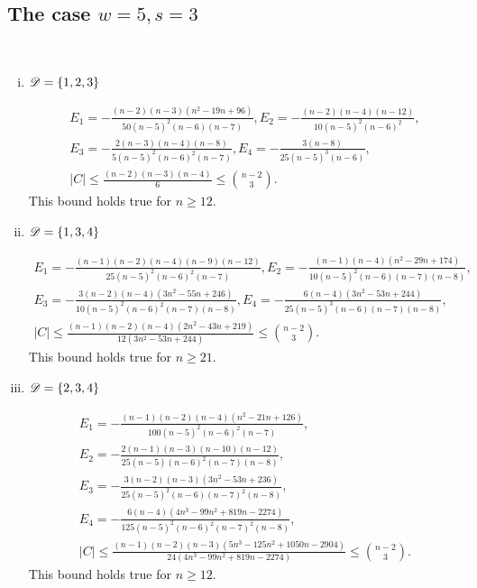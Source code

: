 \documentclass{amsart}
\begin{document}
{\begin{enumerate}[(i)]
\end{enumerate}

\subsection{The case \texorpdfstring{$w=5,s=3$}.}  \label{App:5,3}\hfill\\
\begin{enumerate}[(i)]
\item $\mathscr{D}=\{1,2,3\}$

\begin{gather*}
E_1=-\frac{(n-2)(n-3)\left(n^2-19n+96\right)}{50(n-5)^2 (n-6)(n-7)}, E_2=-\frac{(n-2)(n-4)(n-12)}{10(n-5)^2(n-6)^2},\\ E_3=-\frac{2(n-3)(n-4)(n-8)}{5(n-5)^2(n-6)^2(n-7)},
E_4=-\frac{3(n-8)}{25(n-5)^3(n-6)},\\
|C|\le \frac{(n-2)(n-3)(n-4)}{6}\le \binom{n-2}{3}.
\end{gather*}
This bound holds true for $n\ge 12.$

\item $\mathscr{D}=\{1,3,4\}$

\begin{gather*}
E_1=-\frac{(n-1)(n-2)(n-4)(n-9)(n-12)}{25(n-5)^2 (n-6)^2 (n-7)}, E_2=-\frac{(n-1)(n-4)\left(n^2-29n+174\right)}{10(n-5)^2(n-6)(n-7)(n-8)},\\ E_3=-\frac{3(n-2)(n-4)\left(3n^2-55n+246\right)}{10(n-5)^2(n-6)^2(n-7)(n-8)},
E_4=-\frac{6(n-4)\left(3n^2-53n+244\right)}{25(n-5)^3(n-6)(n-7)(n-8)},\\
|C| \leq \frac{\left(n - 1\right) \left(n - 2\right) \left(n - 4\right) \left(2 n^{2} - 43 n + 219\right)}{12 \left(3 n^{2} - 53 n + 244\right)} \le \binom{n-2}{3}.
\end{gather*}
This bound holds true for $n\ge 21.$

\item $\mathscr{D}=\{2,3,4\}$

\begin{gather*}
E_1=-\frac{(n-1)(n-2)(n-4)\left(n^2-21n+126\right)}{100(n-5)^2 (n-6)^2 (n-7)}, \\
E_2=-\frac{2(n-1)(n-3)(n-10)(n-12)}{25(n-5)(n-6)^2(n-7)(n-8)},\\ 
E_3=-\frac{3(n-2)(n-3)\left(3n^2-53n+236\right)}{25(n-5)^2(n-6)(n-7)^2(n-8)},\\
E_4=-\frac{6(n-4)\left(4n^3-99n^2+819n-2274\right)}{125(n-5)^2(n-6)^2(n-7)^2(n-8)},\\
|C|\le \frac{(n-1)(n-2)(n-3)\left(5n^3-125n^2+1050n-2904\right)}{24\left(4n^3-99n^2+819n-2274\right)}\le \binom{n-2}{3}.
\end{gather*}
This bound holds true for $n\ge 12.$


\end{enumerate}}
\end{document}
